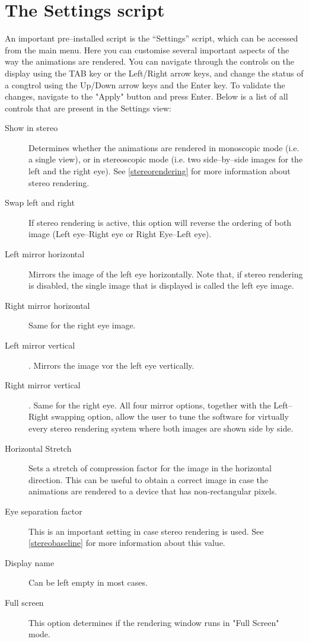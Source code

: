 \section{The Settings script \label{settings}}
An important pre--installed script is the ``Settings'' script, which can be accessed from the main menu. Here you can customise several important aspects of the way the animations are rendered. You can navigate through the controls on the display using the TAB key or the Left/Right arrow keys, and change the status of a congtrol using the Up/Down arrow keys and the Enter key. To validate the changes, navigate to the "Apply" button and press Enter. Below is a list of all controls that are present in the Settings view:
\begin{description}
\item[Show in stereo] Determines whether the animations are rendered in monoscopic mode (i.e. a single view), or in stereoscopic mode (i.e. two side--by--side images for the left and the right eye). See \ref{stereorendering} for more information about stereo rendering.
\item[Swap left and right] If stereo rendering is active, this option will reverse the ordering of both image (Left eye--Right eye or Right Eye--Left eye).
\item[Left mirror horizontal] Mirrors the image of the left eye horizontally. Note that, if stereo rendering is disabled, the single image that is displayed is called the left eye image.
\item[Right mirror horizontal] Same for the right eye image.
\item[Left mirror vertical]. Mirrors the image vor the left eye vertically.
\item[Right mirror vertical]. Same for the right eye. All four mirror options, together with the Left--Right swapping option, allow the user to tune the software for virtually every stereo rendering system where both images are shown side by side.
\item[Horizontal Stretch] Sets a stretch of compression factor for the image in the horizontal direction. This can be useful to obtain a correct image in case the animations are rendered to a device that has non-rectangular pixels.
\item[Eye separation factor] This is an important setting in case stereo rendering is used. See \ref{stereobaseline} for more information about this value.
\item[Display name] Can be left empty in most cases.
\item[Full screen] This option determines if the rendering window runs in "Full Screen" mode.

\end{description}
